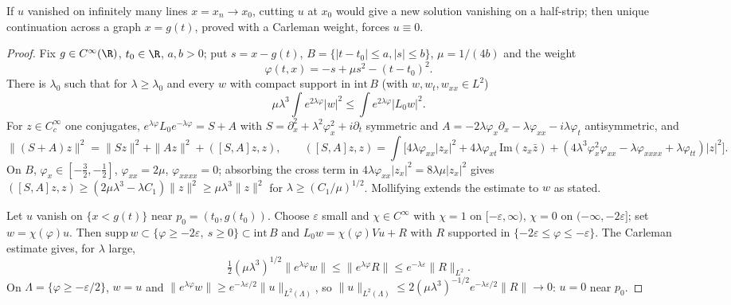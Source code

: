\begin{proofidea}
If $u$ vanished on infinitely many lines $x=x_n\to x_0$, cutting $u$ at $x_0$ would give a new solution vanishing on a half-strip; then unique continuation across a graph $x=g(t)$, proved with a Carleman weight, forces $u\equiv0$.
\end{proofidea}

\begin{proof}
Fix $g\in C^\infty(\R)$, $t_0\in\R$, $a,b>0$; put $s=x-g(t)$, $B=\{|t-t_0|\le a,|s|\le b\}$, $\mu=1/(4b)$ and the weight
\[
\varphi(t,x)=-s+\mu s^2-(t-t_0)^2 .
\]
There is $\lambda_0$ such that for $\lambda\ge\lambda_0$ and every $w$ with compact support in $\mathrm{int}\,B$ (with $w,w_t,w_{xx}\in L^2$)
\[
\mu\lambda^3\int e^{2\lambda\varphi}|w|^2\le\int e^{2\lambda\varphi}|L_0w|^2 .
\]
For $z\in C_c^\infty$ one conjugates, $e^{\lambda\varphi}L_0e^{-\lambda\varphi}=S+A$ with $S=\partial_x^2+\lambda^2\varphi_x^2+i\partial_t$ symmetric and $A=-2\lambda\varphi_x\partial_x-\lambda\varphi_{xx}-i\lambda\varphi_t$ antisymmetric, and
\[
\|(S+A)z\|^2=\|Sz\|^2+\|Az\|^2+([S,A]z,z),\qquad ([S,A]z,z)=\int\!\big[4\lambda\varphi_{xx}|z_x|^2+4\lambda\varphi_{xt}\,\mathrm{Im}(z_x\bar z)+(4\lambda^3\varphi_x^2\varphi_{xx}-\lambda\varphi_{xxxx}+\lambda\varphi_{tt})|z|^2\big].
\]
On $B$, $\varphi_x\in[-\tfrac32,-\tfrac12]$, $\varphi_{xx}=2\mu$, $\varphi_{xxxx}=0$; absorbing the cross term in $4\lambda\varphi_{xx}|z_x|^2=8\lambda\mu|z_x|^2$ gives $([S,A]z,z)\ge(2\mu\lambda^3-\lambda C_1)\|z\|^2\ge\mu\lambda^3\|z\|^2$ for $\lambda\ge(C_1/\mu)^{1/2}$. Mollifying extends the estimate to $w$ as stated.

Let $u$ vanish on $\{x<g(t)\}$ near $p_0=(t_0,g(t_0))$. Choose $\varepsilon$ small and $\chi\in C^\infty$ with $\chi=1$ on $[-\varepsilon,\infty)$, $\chi=0$ on $(-\infty,-2\varepsilon]$; set $w=\chi(\varphi)u$. Then $\mathrm{supp}\,w\subset\{\varphi\ge-2\varepsilon,\ s\ge0\}\subset\mathrm{int}\,B$ and $L_0w=\chi(\varphi)Vu+R$ with $R$ supported in $\{-2\varepsilon\le\varphi\le-\varepsilon\}$. The Carleman estimate gives, for $\lambda$ large,
\[
\tfrac12(\mu\lambda^3)^{1/2}\|e^{\lambda\varphi}w\|\le\|e^{\lambda\varphi}R\|\le e^{-\lambda\varepsilon}\|R\|_{L^2}.
\]
On $\Lambda=\{\varphi\ge-\varepsilon/2\}$, $w=u$ and $\|e^{\lambda\varphi}w\|\ge e^{-\lambda\varepsilon/2}\|u\|_{L^2(\Lambda)}$, so $\|u\|_{L^2(\Lambda)}\le2(\mu\lambda^3)^{-1/2}e^{-\lambda\varepsilon/2}\|R\|\to0$: $u=0$ near $p_0$.


\end{proof}
